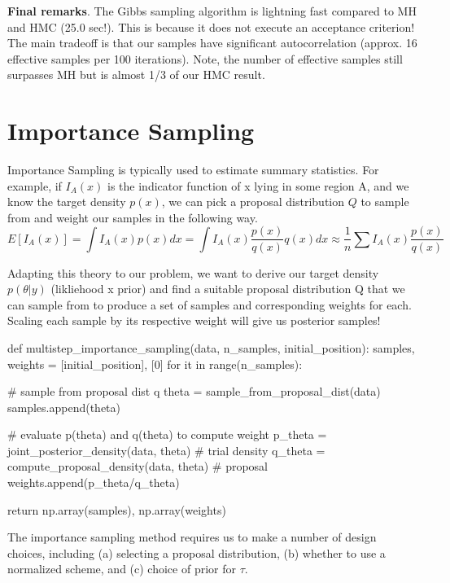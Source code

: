 \documentclass[12pt,letterpaper,twoside]{article}
\begin{document}
\textbf{Final remarks}. The Gibbs sampling algorithm is lightning 
fast compared to MH and HMC (25.0 sec!). This is because it does 
not execute an acceptance criterion! The main tradeoff is that our 
samples have significant autocorrelation (approx. 16 effective 
samples per 100 iterations). Note, the number of effective samples 
still surpasses MH but is almost 1/3 of our HMC result.



\section{Importance Sampling}

Importance Sampling is typically used to estimate summary statistics. 
For example, if $I_A(x)$ is the indicator function of x lying in 
some region A, and we know the target density $p(x)$, we can pick a 
proposal distribution $Q$ to sample from and weight our samples 
in the following way.
$$ E[I_A(x)] = \int I_A(x) p(x) dx = \int I_A(x) \frac{p(x)}{q(x)} q(x) dx \approx \frac{1}{n} \sum I_A(x) \frac{p(x)}{q(x)} $$ 

Adapting this theory to our problem, we want to derive our target 
density $p(\theta|y)$ (likliehood x prior) and find a suitable 
proposal distribution Q that we can sample from to produce a set 
of samples and corresponding weights for each. Scaling each sample 
by its respective weight will give us posterior samples! \newline

\begin{python}
    def multistep_importance_sampling(data, n_samples, initial_position):
    samples, weights = [initial_position], [0]
    for it in range(n_samples):

        # sample from proposal dist q
        theta = sample_from_proposal_dist(data)
        samples.append(theta)

        # evaluate p(theta) and q(theta) to compute weight
        p_theta = joint_posterior_density(data, theta)  # trial density
        q_theta = compute_proposal_density(data, theta)  # proposal
        weights.append(p_theta/q_theta)

    return np.array(samples), np.array(weights)
\end{python}

The importance sampling method requires us to make a number of design 
choices, including (a) selecting a proposal distribution, (b) whether to 
use a normalized scheme, and (c) choice of prior for $\tau$.
\end{document}
